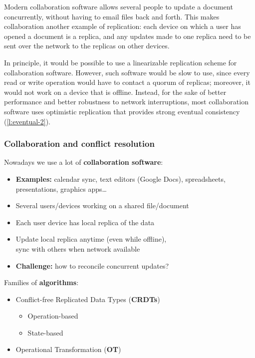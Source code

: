 Modern collaboration software allows several people to update a document concurrently, without having to email files back and forth.
This makes collaboration another example of replication: each device on which a user has opened a document is a replica, and any updates made to one replica need to be sent over the network to the replicas on other devices.

In principle, it would be possible to use a linearizable replication scheme for collaboration software.
However, such software would be slow to use, since every read or write operation would have to contact a quorum of replicas; moreover, it would not work on a device that is offline.
Instead, for the sake of better performance and better robustness to network interruptions, most collaboration software uses optimistic replication that provides strong eventual consistency (\autoref{l:eventual-2}).

\begin{frame}
    \label{s:collaboration}
    \frametitle{Collaboration and conflict resolution}
    Nowadays we use a lot of \textbf{collaboration software}:
    \begin{itemize}
        \item \textbf{Examples:} calendar sync, text editors (Google Docs), spreadsheets, presentations, graphics apps\dots\pause
        \item Several users/devices working on a shared file/document
        \item Each user device has local replica of the data\pause
        \item Update local replica anytime (even while offline),\\sync with others when network available\pause
        \item \textbf{Challenge:} how to reconcile concurrent updates?\\[1em]\pause
    \end{itemize}
    Families of \textbf{algorithms}:
    \begin{itemize}
        \item Conflict-free Replicated Data Types (\textbf{CRDTs})
            \begin{itemize}
                \item Operation-based
                \item State-based
            \end{itemize}
        \item Operational Transformation (\textbf{OT})
    \end{itemize}
\end{frame}
\label{l:collaboration}

